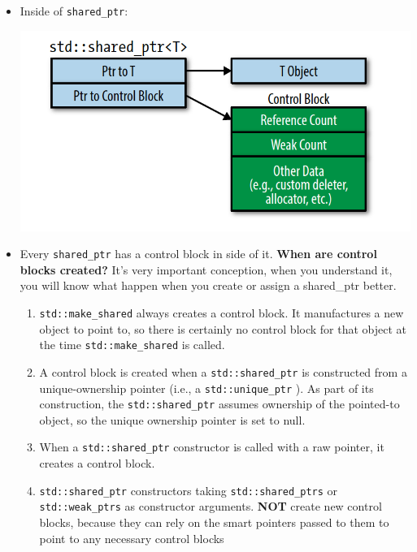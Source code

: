 \documentclass[a4paper,11pt,twoside]{book}
\begin{document}
\begin{itemize}
\item Inside of \texttt{shared\_ptr}: \newline
\begin{center}
\includegraphics[scale=0.6]{pics/shared.png}
\end{center}


\item Every \texttt{shared\_ptr} has a control block in side of it. \textbf{When are control blocks created?}  It's very important conception, when you understand it, you will know what happen when you create or assign a shared\_ptr better. 

\begin{enumerate}
	\item \texttt{std::make\_shared}  always creates a control block. It manufactures
	a new object to point to, so there is certainly no control block for that
	object at the time \texttt{std::make\_shared} is called.
	
	\item A control block is created when a \texttt{std::shared\_ptr} is constructed from a
	unique-ownership pointer (i.e., a \texttt{std::unique\_ptr} ). As part of its construction, the \texttt{std::shared\_ptr} assumes ownership of the pointed-to object, so the unique ownership pointer is set to null.
	
	\item When a \texttt{std::shared\_ptr} constructor is called with a raw pointer, it creates a control block.
	
	\item \texttt{std::shared\_ptr} constructors taking \texttt{std::shared\_ptrs} or \texttt{std::weak\_ptrs} as constructor arguments. \textbf{NOT} create new control blocks, because they can rely on the smart pointers passed to them to point to any necessary control blocks
	

\end{enumerate}
\end{itemize}
\end{document}
